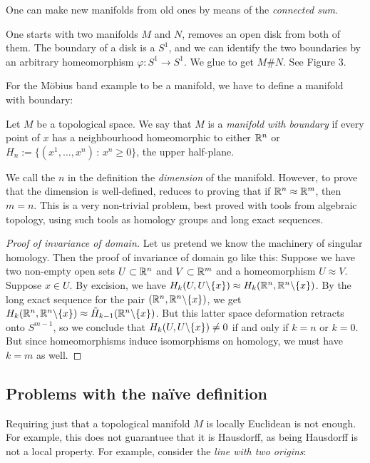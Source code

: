 \documentclass[11pt, english]{article}
\begin{document}
\begin{example}
\label{connectedsum}
One can make new manifolds from old ones by means of the \emph{connected sum}.

One starts with two manifolds $M$ and $N$, removes an open disk from both of them. The boundary of a disk is a $S^1$, and we can identify the two boundaries by an arbitrary homeomorphism $\varphi:S^1 \to S^1$. We glue to get $M\#N$. See Figure 3.%
\end{example}

For the Möbius band example to be a manifold, we have to define a manifold with boundary:
\begin{defi}
Let $M$ be a topological space. We say that $M$ is a \emph{manifold with boundary} if every point of $x$ has a neighbourhood homeomorphic to either $\mathbb{R}^n$ or $H_n:=\{ (x^1,\dotsc,x^n) \, : \, x^n \geq 0 \}$, the upper half-plane.
\end{defi}

We call the $n$ in the definition the \emph{dimension} of the manifold. However, to prove that the dimension is well-defined, reduces to proving that if $\mathbb{R}^n \approx \mathbb{R}^m$, then $m=n$. This is a very non-trivial problem, best proved with tools from algebraic topology, using such tools as homology groups and long exact sequences.

\begin{proof}[Proof of invariance of domain]
Let us pretend we know the machinery of singular homology. Then the proof of invariance of domain go like this: Suppose we have two non-empty open sets $U \subset \mathbb{R}^n$ and $V \subset \mathbb{R}^m$ and a homeomorphism $U \approx V$. Suppose $x \in U$. By excision, we have $H_k(U,U \backslash \{x \}) \approx H_k(\mathbb{R}^n, \mathbb{R}^n \backslash \{ x\})$. By the long exact sequence for the pair $(\mathbb{R}^n,\mathbb{R}^n \backslash \{ x \})$, we get $H_k(\mathbb{R}^n,\mathbb{R}^n \backslash \{x \}) \approx \tilde{H}_{k-1}(\mathbb{R}^n \backslash \{x\})$. But this latter space deformation retracts onto $S^{m-1}$, so we conclude that $H_k(U, U \backslash \{x\}) \neq 0$ if and only if $k=n$ or $k=0$. But since homeomorphisms induce isomorphisms on homology, we must have $k=m$ as well. 
\end{proof}

\subsection{Problems with the naïve definition}

Requiring just that a topological manifold $M$ is locally Euclidean is not enough. For example, this does not guarantuee that it is Hausdorff, as being Hausdorff is not a local property. For example, consider the \emph{line with two origins}:
\end{document}
